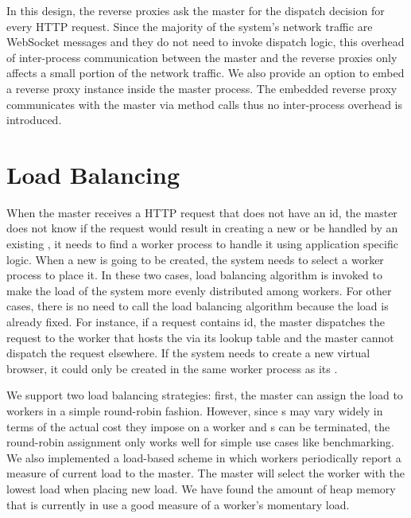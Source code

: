 In this design, the reverse proxies ask the master for the dispatch decision
for every HTTP request.  Since the majority of the system's network traffic
are WebSocket messages and they do not need to invoke dispatch logic,  this
overhead of inter-process communication between the master and the reverse
proxies   only affects a small portion of the network traffic. We also provide
an option to embed a reverse proxy instance inside the master process. The
embedded reverse proxy  communicates with the master via method calls thus no
inter-process overhead is introduced.

\section{Load Balancing}
\label{sec:lb}

When the master receives a HTTP request that does not have an \appins id,
the master does not know if the request would result in creating a new \appins
or be handled by an existing \appins,
it needs to find a worker process to handle it using application specific
logic.
When a new \appins{} is going to be created,
the system needs to select a worker process to place it.
In these two cases, load balancing algorithm is invoked to make the load
of the system more evenly distributed among workers.
For other cases, there is no need to call the load balancing algorithm
because the load is already fixed.
For instance,
if a request contains \appins id, the master dispatches the request to
the worker that hosts the \appins via its lookup table and
the master cannot dispatch the request elsewhere.
If the system needs to create a new virtual browser,
it could only be created in the same worker process as its \appins{}.



We support two load balancing strategies: first, the master can assign the
load to workers in a simple round-robin fashion. However, since \appins{}s may
vary widely in terms of the actual cost they impose on a worker and \appins{}s
can be terminated,  the round-robin assignment only works well for simple use
cases like benchmarking. We also implemented a load-based scheme in which
workers periodically report a measure of current load to the master. The
master will select the worker with the lowest load when placing new load.  We
have found the amount of heap memory that is currently in use a good measure
of a worker's  momentary load.

